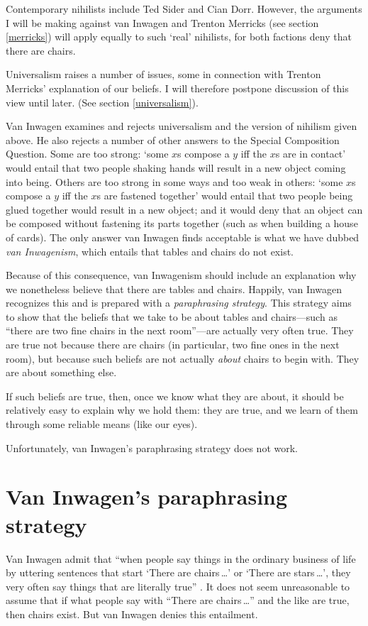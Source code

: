 \documentclass[11pt]{article}
\begin{document}
\begin{spacing}{1.5}
Contemporary nihilists include Ted Sider and Cian Dorr.  However, the
arguments I will be making against van Inwagen and Trenton Merricks
(see section \ref{merricks}) will apply equally to such `real'
nihilists, for both factions deny that there are chairs.

Universalism raises a number of issues, some in connection with
Trenton Merricks' explanation of our beliefs.  I will therefore
postpone discussion of this view until later.  (See section
\ref{universalism}).

Van Inwagen examines and rejects universalism and the version of
nihilism given above.  He also rejects a number of other answers to
the Special Composition Question.  Some are too strong: `some $x$s
compose a $y$ iff the $x$s are in contact' would entail that two
people shaking hands will result in a new object coming into being.
Others are too strong in some ways and too weak in others: `some $x$s
compose a $y$ iff the $x$s are fastened together' would entail that
two people being glued together would result in a new object; and it
would deny that an object can be composed without fastening its parts
together (such as when building a house of cards).  The only answer
van Inwagen finds acceptable is what we have dubbed {\em van
  Inwagenism}, which entails that tables and chairs do not exist.

Because of this consequence, van Inwagenism should include an
explanation why we nonetheless believe that there are tables and
chairs.  Happily, van Inwagen recognizes this and is prepared with a
{\em paraphrasing strategy}.  This strategy aims to show that the
beliefs that we take to be about tables and chairs---such as ``there
are two fine chairs in the next room''---are actually very often true.
They are true not because there are chairs (in particular, two fine
ones in the next room), but because such beliefs are not actually {\em
  about} chairs to begin with.  They are about something else.

If such beliefs are true, then, once we know what they are about, it
should be relatively easy to explain why we hold them: they are true,
and we learn of them through some reliable means (like our eyes).

Unfortunately, van Inwagen's paraphrasing strategy does not work.

\section{Van Inwagen's paraphrasing strategy}
\label{i-para}
Van Inwagen admit that ``when people say things in the ordinary
business of life by uttering sentences that start `There are
chairs\,\ldots ' or `There are stars\,\ldots ', they very often say
things that are literally true'' \cite[102]{inwagen1995}.  It does not
seem unreasonable to assume that if what people say with ``There are
chairs\,\ldots '' and the like are true, then chairs exist.  But van
Inwagen denies this entailment.


\end{spacing}
\end{document}
